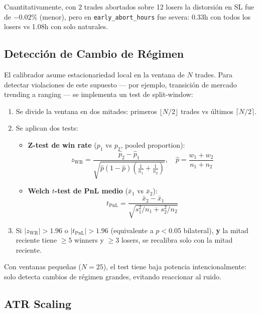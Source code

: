 \documentclass[11pt,a4paper]{article}
\newcommand{\param}[1]{\texttt{\small\color{cpurple}#1}}
\begin{document}
Cuantitativamente, con 2 trades abortados sobre 12 losers la
distorsi\'on en SL fue de $-0.02\%$ (menor), pero en
\param{early\_abort\_hours} fue severa: 0.33h con todos los losers
vs 1.08h con solo naturales.


\subsection{Detecci\'on de Cambio de R\'egimen}
\label{sec:regime}

El calibrador asume estacionariedad local en la ventana de $N$ trades.
Para detectar violaciones de este supuesto --- por ejemplo, transici\'on
de mercado trending a ranging --- se implementa un test de split-window:

\begin{enumerate}[leftmargin=2em]
\item Se divide la ventana en dos mitades: primeros $\lfloor N/2 \rfloor$
  trades vs \'ultimos $\lceil N/2 \rceil$.
\item Se aplican dos tests:
  \begin{itemize}
    \item \textbf{Z-test de win rate} ($p_1$ vs $p_2$, pooled proportion):
    \begin{equation}
    z_{\text{WR}} = \frac{\hat{p}_2 - \hat{p}_1}
      {\sqrt{\hat{p}(1-\hat{p})\left(\frac{1}{n_1}+\frac{1}{n_2}\right)}},
    \quad \hat{p} = \frac{w_1+w_2}{n_1+n_2}
    \end{equation}
    \item \textbf{Welch $t$-test de PnL medio} ($\bar{x}_1$ vs $\bar{x}_2$):
    \begin{equation}
    t_{\text{PnL}} = \frac{\bar{x}_2 - \bar{x}_1}
      {\sqrt{s_1^2/n_1 + s_2^2/n_2}}
    \end{equation}
  \end{itemize}
\item Si $|z_{\text{WR}}| > 1.96$ o $|t_{\text{PnL}}| > 1.96$
  (equivalente a $p < 0.05$ bilateral), \textbf{y} la mitad reciente
  tiene $\geq 5$ winners y $\geq 3$ losers, se recalibra solo con
  la mitad reciente.
\end{enumerate}

Con ventanas peque\~nas ($N=25$), el test tiene baja potencia
intencionalmente: solo detecta cambios de r\'egimen grandes, evitando
reaccionar al ruido.


\subsection{ATR Scaling}
\label{sec:atr_scaling}
\end{document}
